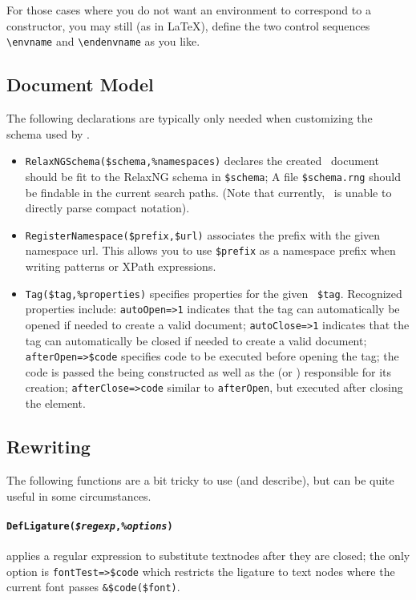 \documentclass{book}
\newcommand{\ltxcode}{\lstinline[style=inlinelatexml]}
\begin{document}
For those cases where you do not want an environment to correspond
to a constructor, you may still (as in \LaTeX), define the
two control sequences \verb|\envname| and \verb|\endenvname|
as you like.

\subsection{Document Model}\label{customization.latexml.schema}
The following declarations are typically only needed when customizing
the schema used by \LaTeXML.
\begin{itemize}
\item \ltxcode|RelaxNGSchema($schema,%
 \XML\ document should be fit to the RelaxNG schema in \ltxcode|$schema|;
 A file \ltxcode|$schema.rng| should be findable in the current search paths.
(Note that currently, \LaTeXML\ is unable to directly parse compact notation).
\item \ltxcode|RegisterNamespace($prefix,$url)| associates the
 prefix with the given namespace url.  This allows you to use \ltxcode|$prefix|
 as a namespace prefix when writing  patterns or XPath expressions.
\item \ltxcode|Tag($tag,%
Recognized properties include:
\ltxcode|autoOpen=>1| indicates that the tag
can automatically be opened if needed to create a valid document;
\ltxcode|autoClose=>1| indicates that the tag can automatically be closed if needed to create
a valid document;
\ltxcode|afterOpen=>$code| specifies code to be executed before opening the tag;
the code is passed the  being constructed as well as the
 (or ) responsible for its creation;
\ltxcode|afterClose=>code| similar to \texttt{afterOpen}, but executed after closing
the element.
\end{itemize}

\subsection{Rewriting}\label{customization.latexml.rewriting}
The following functions are a bit tricky to use (and describe),
but can be quite useful in some circumstances.

\paragraph[DefLigature]{%
    \texttt{DefLigature(\textit{\$regexp},\textit{\%options})}}
applies a regular expression
to substitute textnodes after they are closed; the only option is \ltxcode|fontTest=>$code|
which restricts the ligature to text nodes where the current font passes \ltxcode|&$code($font)|.
\end{document}
